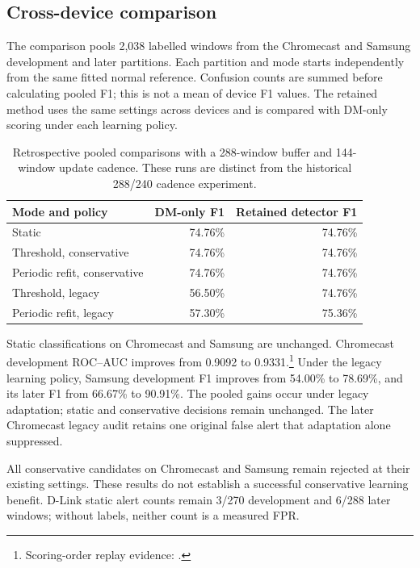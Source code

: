\subsection{Cross-device comparison}

The comparison pools 2,038 labelled windows from the Chromecast and Samsung
development and later partitions. Each partition and mode starts independently
from the same fitted normal reference. Confusion counts are summed before
calculating pooled F1; this is not a mean of device F1 values. The retained
method uses the same settings across devices and is
compared with DM-only scoring under each learning policy.

\begin{table}[H]
\centering\small
\begin{tabular}{lrr}
\toprule
\textbf{Mode and policy} & \textbf{DM-only F1} & \textbf{Retained detector F1} \\
\midrule
Static & 74.76\% & 74.76\% \\
Threshold, conservative & 74.76\% & 74.76\% \\
Periodic refit, conservative & 74.76\% & 74.76\% \\
Threshold, legacy & 56.50\% & 74.76\% \\
Periodic refit, legacy & 57.30\% & 75.36\% \\
\bottomrule
\end{tabular}
\caption{Retrospective pooled comparisons with a 288-window buffer and
144-window update cadence. These runs are distinct from the historical
288/240 cadence experiment.}
\label{tab:retained-scoring}
\end{table}

Static classifications on Chromecast and Samsung are unchanged. Chromecast
development ROC--AUC improves from 0.9092 to 0.9331.\footnote{Scoring-order
replay evidence: .}
Under the legacy learning
policy, Samsung development F1 improves from 54.00\% to 78.69\%, and its later
F1 from 66.67\% to 90.91\%.
The pooled gains occur under legacy adaptation; static and conservative
decisions remain unchanged. The later Chromecast legacy audit retains one
original false alert that adaptation alone suppressed.

All conservative candidates on Chromecast and Samsung remain rejected at their
existing settings. These results do not establish a successful conservative
learning benefit. D-Link static alert counts remain 3/270 development and 6/288
later windows; without labels, neither count is a measured FPR.

